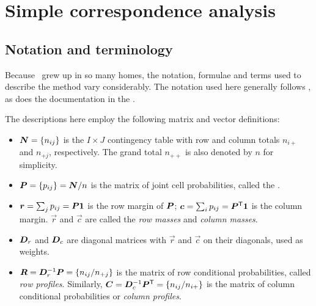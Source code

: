 \section{Simple correspondence analysis}\label{sec:ca-simple}
\subsection{Notation and terminology}\label{sec:ca-notation}
Because \CA\ grew up in so many homes, the notation, formulae
and terms used to describe the method vary considerably.
The notation used here generally follows \citet{Greenacre:84,Greenacre:97},
as does the documentation in the .

The descriptions here employ the following matrix and vector definitions:
\begin{itemize}
\item $\bm{N} = \{ n_{ij} \}$ is the $I \times J$ contingency table
with row and column totals $n_{i+}$ and $n_{+j}$, respectively.
The grand total $n_{++}$ is also denoted by $n$ for simplicity.
\item $\bm{P} = \{ p_{ij} \} = \bm{N}/n$ is the matrix of joint cell
probabilities,  called the .
\item $\bm{r} = \sum_j p_{ij} = \bm{P} \bm{1}$ is the row margin of $\bm{P}$;
$\bm{c} = \sum_i p_{ij} = \bm{P}^\mathsf{T} \bm{1}$ is the column margin.
$\vec{r}$ and $\vec{c}$ are called the \emph{row masses} and \emph{column masses}.
\item $\bm{D}_r$ and $\bm{D}_c$ are diagonal matrices with $\vec{r}$
and $\vec{c}$ on their diagonals, used as weights.
\item $\bm{R} = \bm{D}_r^{-1} \bm{P} = \{ n_{ij} / n_{+j} \}$ is the matrix of
row conditional probabilities, called \emph{row profiles}.
Similarly, $\bm{C} = \bm{D}_c^{-1} \bm{P}^\mathsf{T} = \{ n_{ij} / n_{i+} \}$ is the matrix of
column conditional probabilities or \emph{column profiles}.
\end{itemize}

